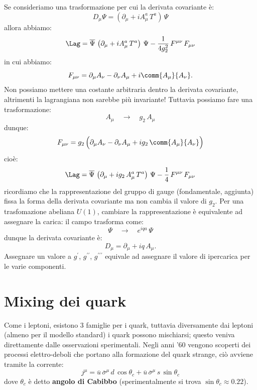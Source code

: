 Se consideriamo una trasformazione per cui la derivata covariante è:
\begin{equation}
    D_\mu\Psi = \left(\partial_\mu + iA_\mu^a\, T^a\right)\, \Psi
\end{equation}
allora abbiamo:
\begin{equation}
    \Lag = \overline{\Psi}\, \left(\partial_\mu + iA_\mu^a\, T^a\right)\, \Psi - \frac{1}{4g_2^2}\, F^{\mu\nu}\, F_{\mu\nu}
\end{equation}
in cui abbiamo:
\begin{equation}
    F_{\mu\nu} = \partial_\mu A_\nu - \partial_\nu A_\mu + i\comm{A_\mu}{A_\nu}.
\end{equation}
Non possiamo mettere una costante arbitraria dentro la derivata covariante, altrimenti la lagrangiana non sarebbe più invariante! Tuttavia possiamo fare una trasformazione:
\begin{equation}
    A_\mu \quad \longrightarrow \quad g_2\, A_\mu
\end{equation}
dunque:
\begin{equation}
    F_{\mu\nu} = g_2\, \Big( \partial_\mu A_\nu - \partial_\nu A_\mu + ig_2\, \comm{A_\mu}{A_\nu} \Big)
\end{equation}
cioè:
\begin{equation}
    \Lag = \overline{\Psi}\, \left(\partial_\mu + ig_2\, A_\mu^a\, T^a\right)\, \Psi - \frac{1}{4}\, F^{\mu\nu}\, F_{\mu\nu}
\end{equation}
ricordiamo che la rappresentazione del gruppo di gauge (fondamentale, aggiunta) fissa la forma della derivata covariante ma non cambia il valore di $g_2$. Per una trasfomazione abeliana $U(1)$, cambiare la rappresentazione è equivalente ad assegnare la carica: il campo trasforma come:
\begin{equation}
    \Psi \quad \longrightarrow \quad e^{iqa}\, \Psi
\end{equation}
dunque la derivata covariante è:
\begin{equation}
    D_\mu = \partial_\mu + iq\, A_\mu.
\end{equation}
Assegnare un valore a $g^\prime$, $g^{\prime\prime}$, $g^{\prime\prime\prime}$ equivale ad assegnare il valore di ipercarica per le varie componenti.


\section{Mixing dei quark}

Come i leptoni, esistono 3 famiglie per i quark, tuttavia diversamente dai leptoni (almeno per il modello standard) i quark possono mischiarsi; questo veniva direttamente dalle osservazioni sperimentali. Negli anni '60 vengono scoperti dei processi elettro-deboli che portano alla formazione del quark strange, ciò avviene tramite la corrente:
\begin{equation}
    j^\mu = \overline{u}\, \overline{\sigma}^\mu\, d\, \cos\theta_c + \overline{u}\, \overline{\sigma}^\mu\, s\, \sin\theta_c
\end{equation}
dove $\theta_c$ è detto \textbf{angolo di Cabibbo} (sperimentalmente si trova $\sin\theta_c \approx 0.22$).

